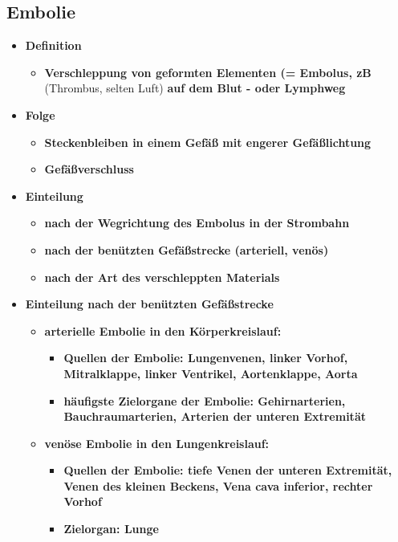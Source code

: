 	\subsection*{Embolie}
		\begin{itemize}
			\item \textbf{Definition}
				\begin{itemize}
					\item \textbf{Verschleppung von geformten Elementen (= Embolus, zB } (Thrombus, selten Luft)\textbf{ auf dem Blut - oder Lymphweg}
				\end{itemize}
			\item \textbf{Folge}
					\begin{itemize}
						\item \textbf{Steckenbleiben in einem Gefäß mit engerer Gefäßlichtung}
						\item \textbf{Gefäßverschluss}
					\end{itemize}
			\item \textbf{Einteilung}
				\begin{itemize}
					\item \textbf{nach der Wegrichtung des Embolus in der Strombahn}
					\item \textbf{nach der benützten Gefäßstrecke (arteriell, venös)}
					\item \textbf{nach der Art des verschleppten Materials}
				\end{itemize}
			\item \textbf{Einteilung nach der benützten Gefäßstrecke}
				\begin{itemize}
					\item \textbf{arterielle Embolie in den Körperkreislauf:}
						\begin{itemize}
							\item \textbf{Quellen der Embolie: Lungenvenen, linker Vorhof, Mitralklappe, linker Ventrikel, Aortenklappe, Aorta}
							\item \textbf{häufigste Zielorgane der Embolie: Gehirnarterien, Bauchraumarterien, Arterien der unteren Extremität}
						\end{itemize}
					\item \textbf{venöse Embolie in den Lungenkreislauf:}
						\begin{itemize}
							\item \textbf{Quellen der Embolie: tiefe Venen der unteren Extremität, Venen des kleinen Beckens, Vena cava inferior, rechter Vorhof}
							\item \textbf{Zielorgan: Lunge}
						\end{itemize}
				\end{itemize}
		\end{itemize}
